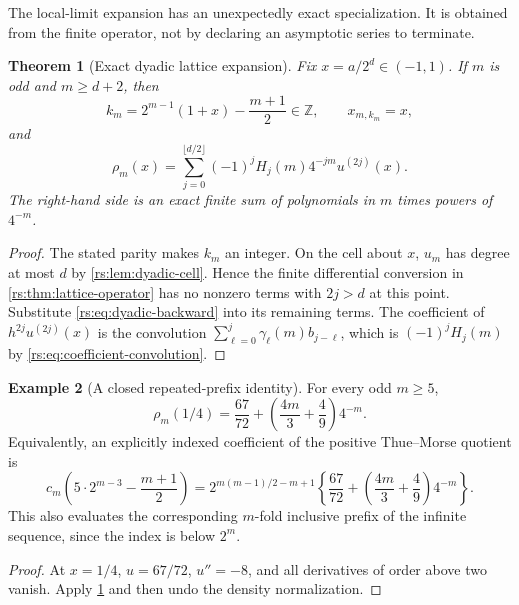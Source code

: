 \documentclass[11pt,a4paper,oneside,openany]{book}
\numberwithin{equation}{chapter}
\newtheorem{theorem}{Theorem}[chapter]
\theoremstyle{definition}
\newtheorem{example}[theorem]{Example}
\theoremstyle{remark}
\newcommand{\Z}{\mathbb Z}
\begin{document}
The local-limit expansion has an unexpectedly exact specialization.
It is obtained from the finite operator, not by declaring an
asymptotic series to terminate.

\begin{theorem}[Exact dyadic lattice expansion]\label{rs:thm:dyadic-lattice}
Fix $x=a/2^d\in(-1,1)$. If $m$ is odd and $m\geq d+2$, then
\begin{equation}
 k_m=2^{m-1}(1+x)-\frac{m+1}{2}\in\Z,
 \qquad x_{m,k_m}=x,
\end{equation}
and
\begin{equation}
 \boxed{\quad
 \rho_m(x)=\sum_{j=0}^{\lfloor d/2\rfloor}
                 (-1)^jH_j(m)4^{-jm}u^{(2j)}(x).
 \quad}
 \label{rs:eq:exact-dyadic-lattice}
\end{equation}
The right-hand side is an exact finite sum of polynomials in $m$
times powers of $4^{-m}$.
\end{theorem}
\begin{proof}
The stated parity makes $k_m$ an integer. On the cell about $x$,
$u_m$ has degree at most $d$ by \cref{rs:lem:dyadic-cell}. Hence the
finite differential conversion in \cref{rs:thm:lattice-operator} has
no nonzero terms with $2j>d$ at this point. Substitute
\eqref{rs:eq:dyadic-backward} into its remaining terms. The coefficient
of $h^{2j}u^{(2j)}(x)$ is the convolution
$\sum_{\ell=0}^j\gamma_\ell(m)b_{j-\ell}$, which is
$(-1)^jH_j(m)$ by \eqref{rs:eq:coefficient-convolution}.
\end{proof}

\begin{example}[A closed repeated-prefix identity]\label{rs:ex:quarter-lattice}
For every odd $m\geq5$,
\begin{equation}
 \rho_m(1/4)=\frac{67}{72}
       +\left(\frac{4m}{3}+\frac49\right)4^{-m}.
 \label{rs:eq:quarter-lattice-exact}
\end{equation}
Equivalently, an explicitly indexed coefficient of the positive
Thue--Morse quotient is
\begin{equation}
 \boxed{\quad
 c_m\left(5\cdot2^{m-3}-\frac{m+1}{2}\right)
 =2^{m(m-1)/2-m+1}
  \left\{\frac{67}{72}+
         \left(\frac{4m}{3}+\frac49\right)4^{-m}\right\}.
 \quad}
 \label{rs:eq:closed-prefix-quarter}
\end{equation}
This also evaluates the corresponding $m$-fold inclusive prefix
of the infinite sequence, since the index is below $2^m$.
\end{example}
\begin{proof}
At $x=1/4$, $u=67/72$, $u''=-8$, and all derivatives of order
above two vanish. Apply \cref{rs:thm:dyadic-lattice} and then undo
the density normalization.
\end{proof}
\end{document}
